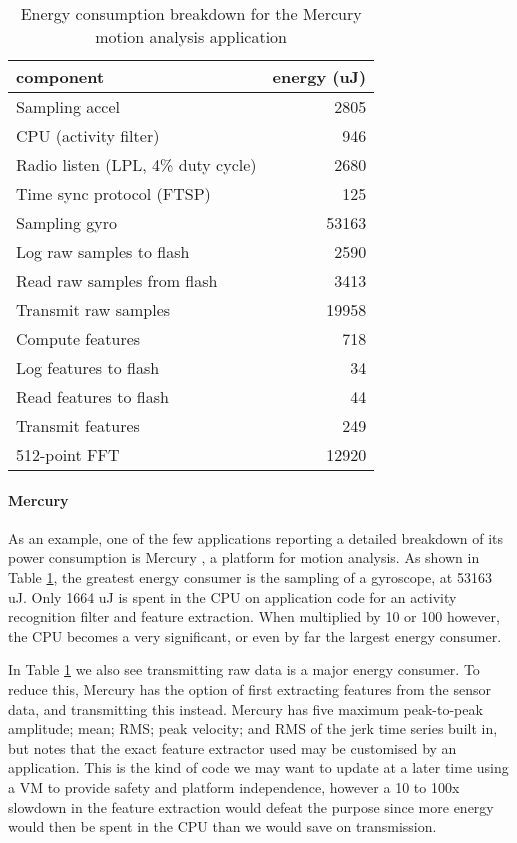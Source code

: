 \begin{table}[H]
\centering
\caption{Energy consumption breakdown for the Mercury motion analysis application}
\label{tbl-mercury-energy}
\begin{tabular}{lr}
\toprule
component                          & energy (uJ) \\
\midrule
Sampling accel                     & 2805  \\
CPU (activity filter)              & 946   \\
Radio listen (LPL, 4\% duty cycle) & 2680  \\
Time sync protocol (FTSP)          & 125   \\
Sampling gyro                      & 53163 \\
Log raw samples to flash           & 2590  \\
Read raw samples from flash        & 3413  \\
Transmit raw samples               & 19958 \\
\midrule
Compute features                   & 718   \\
Log features to flash              & 34    \\
Read features to flash             & 44    \\
Transmit features                  & 249   \\
\midrule
512-point FFT                      & 12920 \\
\bottomrule
\end{tabular}
\end{table}

\paragraph{Mercury}
As an example, one of the few applications reporting a detailed breakdown of its power consumption is Mercury \cite{Lorincz:2009kt}, a platform for motion analysis. As shown in Table \ref{tbl-mercury-energy}, the greatest energy consumer is the sampling of a gyroscope, at 53163 uJ. Only 1664 uJ is spent in the CPU on application code for an activity recognition filter and feature extraction. When multiplied by 10 or 100 however, the CPU becomes a very significant, or even by far the largest energy consumer.

In Table \ref{tbl-mercury-energy} we also see transmitting raw data is a major energy consumer. To reduce this, Mercury has the option of first extracting features from the sensor data, and transmitting this instead. Mercury has five maximum peak-to-peak amplitude; mean; RMS; peak velocity; and RMS of the jerk time series built in, but notes that the exact feature extractor used may be customised by an application. This is the kind of code we may want to update at a later time using a VM to provide safety and platform independence, however a 10 to 100x slowdown in the feature extraction would defeat the purpose since more energy would then be spent in the CPU than we would save on transmission.

